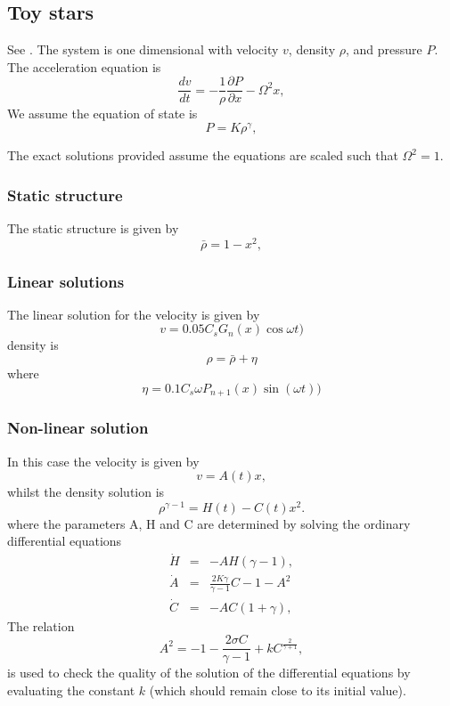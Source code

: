 \documentclass[a4paper,12pt]{article}
\begin{document}
\subsection{Toy stars}
 See \citet{mp04}. The system is one dimensional with velocity $v$, density $\rho$, and pressure
$P$. The acceleration equation is 
\begin{equation}
\frac{dv}{dt} = - \frac{1}{\rho} \frac{\partial P}{\partial x}  - \Omega^2 x,
\end{equation}
 We assume the equation of state is 
\begin{equation}
P = K \rho^\gamma,
\end{equation} 

 The exact solutions provided assume the equations are scaled such that
$\Omega^2 = 1$.
 
\subsubsection{Static structure}
The static structure is given by
\begin{equation}
\bar \rho = 1- x^2,
\end{equation}

\subsubsection{Linear solutions}
The linear solution for the velocity is given by
\begin{equation}
v = 0.05 C_s G_n(x) \cos{\omega t} )
\end{equation}
density is
\begin{equation}
\rho = \bar{\rho} + \eta
\end{equation}
where 
\begin{equation}
\eta = 0.1 C_s \omega P_{n+1}(x) \sin{(\omega t)})
\end{equation}

\subsubsection{Non-linear solution}
In this case the velocity is given by
\begin{equation}
v = A(t) x,
\end{equation}
whilst the density solution is
\begin{equation}
\rho^{\gamma -1} = H(t) - C(t) x^2.
\end{equation}
where the parameters A, H and C are determined by solving the ordinary
differential equations
\begin{eqnarray}
\dot{H} & = & -AH(\gamma -1), \\
\dot{A} & = & \frac{2K \gamma}{\gamma -1} C - 1 - A^2 \\
\dot{C} & = & -AC(1+ \gamma),
\end{eqnarray}
The relation
\begin{equation}
A^2 = -1 - \frac{2 \sigma C}{\gamma -1} + kC^{\frac{2}{\gamma +1}},
\label{eq:kconst}
\end{equation}
is used to check the quality of the solution of the differential equations by
evaluating the constant $k$ (which should remain close to its initial value).
\end{document}
